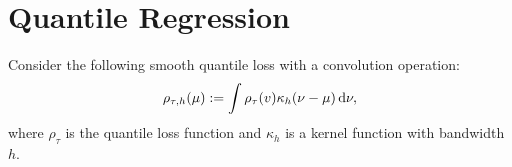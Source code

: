 \chapter{Quantile Regression}

\begin{definition}
	Consider the following smooth quantile loss with a convolution operation:
	\begin{equation}
		\label{eq:smooth-quantile-loss}
		\rho_{\tau,h}(\mu):=\int\rho_{\tau}(v)\kappa_{h}(\nu-\mu)\mathop{}\!\mathrm{d}\nu,
	\end{equation}
	where $\rho_{\tau}$ is the quantile loss function and $\kappa_{h}$ is a kernel function with bandwidth $h$.
\end{definition}
